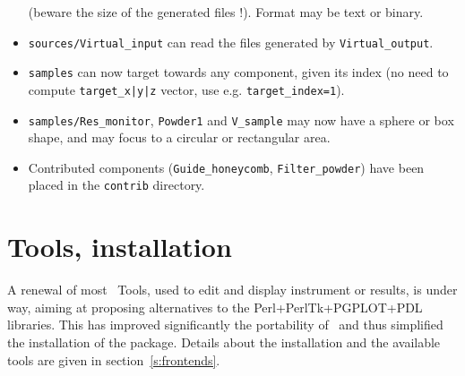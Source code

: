 \begin{itemize}
    (beware the size of the generated files !). Format may be text or binary.
\item \verb+sources/Virtual_input+ can read the files generated by \verb+Virtual_output+.
\item \verb+samples+ can now target towards any component, given its index 
    (no need to compute \verb+target_x|y|z+ vector, use e.g. \verb+target_index=1+).
\item \verb+samples/Res_monitor+, \verb+Powder1+ and \verb+V_sample+ may now have a
    sphere or box shape, and may focus to a circular or rectangular area.
\item Contributed components (\verb+Guide_honeycomb+, \verb+Filter_powder+) have been
    placed in the \verb+contrib+ directory. 
\end{itemize}

\section{Tools, installation}
\label{s:new-features:tools}
  A renewal of most \MCS\ Tools, used to edit and display instrument or results, is under way, aiming at proposing alternatives to the Perl+PerlTk+PGPLOT+PDL libraries.
  This has improved significantly the portability of \MCS\ and thus simplified the
  installation of the package. Details about the installation and the available tools are given in section~\ref{s:frontends}.

